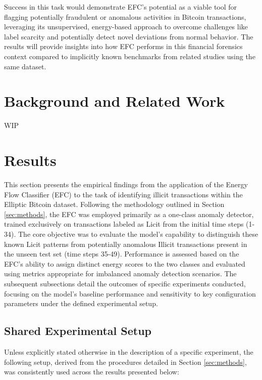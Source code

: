 \documentclass[12pt]{article}
\begin{document}
Success in this task would demonstrate EFC's potential as a viable tool for flagging potentially fraudulent or anomalous
activities in Bitcoin transactions, leveraging its unsupervised, energy-based approach to overcome challenges like label
scarcity and potentially detect novel deviations from normal behavior. The results will provide insights into how EFC
performs in this financial forensics context compared to implicitly known benchmarks from related studies using the same
dataset.

\section{Background and Related Work}
WIP

\section{Results} \label{sec:results}

This section presents the empirical findings from the application of the Energy Flow Classifier (EFC) to the task of
identifying illicit transactions within the Elliptic Bitcoin dataset. Following the methodology outlined in Section
\ref{sec:methods}, the EFC was employed primarily as a one-class anomaly detector, trained exclusively on transactions
labeled as Licit from the initial time steps (1-34). The core objective was to evaluate the model's capability to distinguish
these known Licit patterns from potentially anomalous Illicit transactions present in the unseen test set (time steps 35-49).
Performance is assessed based on the EFC's ability to assign distinct energy scores to the two classes and evaluated using
metrics appropriate for imbalanced anomaly detection scenarios. The subsequent subsections detail the outcomes of specific
experiments conducted, focusing on the model's baseline performance and sensitivity to key configuration parameters under
the defined experimental setup.

\subsection{Shared Experimental Setup} \label{subsec:shared_setup}

Unless explicitly stated otherwise in the description of a specific experiment, the following setup, derived from the procedures
detailed in Section \ref{sec:methods}, was consistently used across the results presented below:
\end{document}
